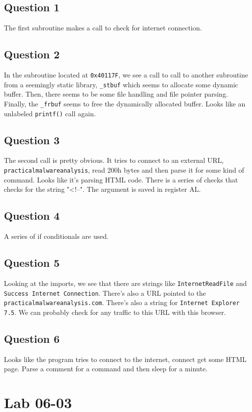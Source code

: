 \documentclass[11pt]{article}
\begin{document}
\subsection{Question 1}
\label{sec-3-1}
The first subroutine makes a call to check for internet connection.    
\subsection{Question 2}
\label{sec-3-2}
In the subroutine located at \texttt{0x40117F}, we see a call to call to another
subroutine from a seemingly static library, \texttt{\_stbuf} which seems to allocate
some dynamic buffer. Then, there seems to be some file handling and file
pointer parsing. Finally, the \texttt{\_frbuf} seems to free the dynamically
allocated buffer.  Looks like an unlabeled \texttt{printf()} call again.
\subsection{Question 3}
\label{sec-3-3}
The second call is pretty obvious. It tries to connect to an external URL,
\texttt{practicalmalwareanalysis}, read 200h bytes and then parse it for some kind
of command. Looks like it's parsing HTML code. There is a series of checks
that checks for the string "<!--".  The argument is saved in register AL.
\subsection{Question 4}
\label{sec-3-4}
A series of if conditionals are used.
\subsection{Question 5}
\label{sec-3-5}
Looking at the imports, we see that there are strings like \texttt{InternetReadFile}
and \texttt{Success Internet Connection}. There's also a URL pointed to the
\texttt{practicalmalwareanalysis.com}. There's also a string for \texttt{Internet Explorer
7.5}. We can probably check for any traffic to this URL with this browser. 
\subsection{Question 6}
\label{sec-3-6}
Looks like the program tries to connect to the internet, connect get some
HTML page. Parse a comment for a command and then sleep for a minute.
\section{Lab 06-03}
\label{sec-4}
\end{document}
